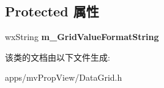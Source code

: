 \subsection*{Protected 属性}
\begin{DoxyCompactItemize}
\item 
\hypertarget{class_data_grid_data_provider_a817bfaf9a82b37508c82b1445167cb17}{wx\+String {\bfseries m\+\_\+\+Grid\+Value\+Format\+String}}\label{class_data_grid_data_provider_a817bfaf9a82b37508c82b1445167cb17}

\end{DoxyCompactItemize}


该类的文档由以下文件生成\+:\begin{DoxyCompactItemize}
\item 
apps/mv\+Prop\+View/Data\+Grid.\+h\end{DoxyCompactItemize}
